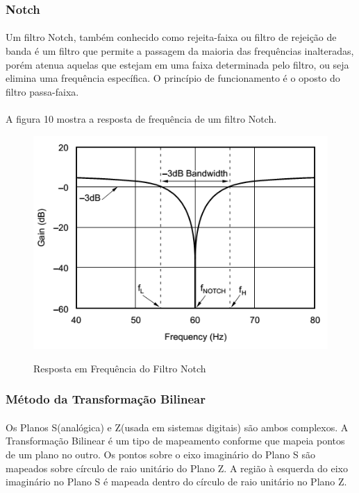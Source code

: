 \documentclass[12pt,fleqn]{article}
\begin{document}
\subsubsection{Notch}
\paragraph{} Um filtro Notch, também conhecido como rejeita-faixa ou filtro de rejeição de banda é um filtro que permite a passagem da maioria das frequências inalteradas, porém atenua aquelas que estejam em uma faixa determinada pelo filtro, ou seja elimina uma frequência específica. O princípio de funcionamento é o oposto do filtro passa-faixa.

\paragraph{} A figura 10 mostra a resposta de frequência de um filtro Notch.

\begin{figure}[!htb]
    \centering
    \includegraphics[scale=0.6]{fig/figura10.png}
    \label{figura:figura6}
    \caption{Resposta em Frequência do Filtro Notch}
\end{figure}

\subsubsection{Método da Transformação Bilinear}
\paragraph{} Os Planos S(analógica) e Z(usada em sistemas digitais) são ambos complexos. A Transformação Bilinear é um tipo de mapeamento conforme que mapeia pontos de um plano no outro. Os pontos sobre o eixo imaginário do Plano S são mapeados sobre círculo de raio unitário do Plano Z. A região à esquerda do eixo imaginário no Plano S é mapeada dentro do círculo de raio unitário no Plano Z.
\end{document}
